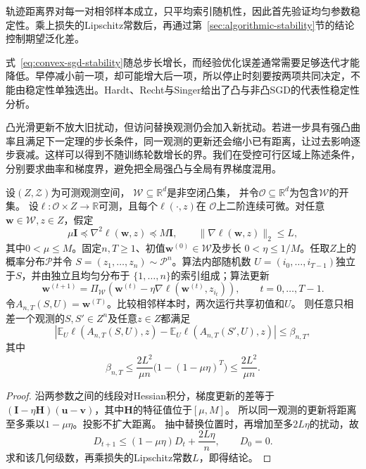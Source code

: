 轨迹距离界对每一对相邻样本成立，只平均索引随机性，因此首先验证均匀参数稳定性。乘上损失的Lipschitz常数后，再通过第~\ref{sec:algorithmic-stability}节的结论控制期望泛化差。

式~\eqref{eq:convex-sgd-stability}随总步长增长，而经验优化误差通常需要足够迭代才能降低。早停减小前一项，却可能增大后一项，所以停止时刻要按两项共同决定，不能由稳定性单独选出。Hardt、Recht与Singer给出了凸与非凸SGD的代表性稳定性分析。


凸光滑更新不放大旧扰动，但访问替换观测仍会加入新扰动。若进一步具有强凸曲率且满足下一定理的步长条件，同一观测的更新还会缩小已有距离，让过去影响逐步衰减。这样可以得到不随训练轮数增长的界。我们在受控可行区域上陈述条件，分别要求曲率和梯度界，避免把全局强凸与全局有界梯度混用。

\begin{theorem}[强凸投影SGD的稳定性]
\label{thm:strongly-convex-sgd-stability}
设$(Z,\mathcal Z)$为可测观测空间，
$\mathcal W\subseteq\mathbb R^d$是非空闭凸集，
并令$\mathcal O\subseteq\mathbb R^d$为包含$\mathcal W$的开集。
设$\ell:\mathcal O\times Z\to\mathbb R$可测，且每个$\ell(\cdot,z)$在
$\mathcal O$上二阶连续可微。对任意$\bm w\in\mathcal W,z\in Z$，假定
\[
 \mu\bm I\preceq\nabla^2\ell(\bm w,z)\preceq M\bm I,
 \qquad \|\nabla\ell(\bm w,z)\|_2\leq L,
\]
其中$0<\mu\leq M$。固定$n,T\geq1$、初值$\bm w^{(0)}\in\mathcal W$及步长
$0<\eta\leq1/M$。任取$Z$上的概率分布$\mathcal P$并令
$S=(z_1,\ldots,z_n)\sim\mathcal P^n$。算法内部随机数
$U=(i_0,\ldots,i_{T-1})$独立于$S$，并由独立且均匀分布于
$\{1,\ldots,n\}$的索引组成；算法更新
\[
 \bm w^{(t+1)}
 =\Pi_{\mathcal W}\!\left(
 \bm w^{(t)}-\eta\nabla\ell(\bm w^{(t)},z_{i_t})\right),
 \qquad t=0,\ldots,T-1.
\]
令$A_{n,T}(S,U)=\bm w^{(T)}$。比较相邻样本时，两次运行共享初值和$U$。
则任意只相差一个观测的$S,S'\in Z^n$及任意$z\in Z$都满足
\[
 \left|\mathbb E_U\ell(A_{n,T}(S,U),z)
 -\mathbb E_U\ell(A_{n,T}(S',U),z)\right|\leq\beta_{n,T},
\]
其中
\[
 \beta_{n,T}\leq\frac{2L^2}{\mu n}
           \bigl(1-(1-\mu\eta)^T\bigr)
 \leq\frac{2L^2}{\mu n}.
\]
\end{theorem}
\begin{proof}
沿两参数之间的线段对Hessian积分，梯度更新的差等于
$(\bm I-\eta\bm H)(\bm u-\bm v)$，其中$\bm H$的特征值位于$[\mu,M]$。
所以同一观测的更新将距离至多乘以$1-\mu\eta$。投影不扩大距离。
抽中替换位置时，再增加至多$2L\eta$的扰动，故
\[
 D_{t+1}\leq(1-\mu\eta)D_t+\frac{2L\eta}{n},\qquad D_0=0.
\]
求和该几何级数，再乘损失的Lipschitz常数$L$，即得结论。
\end{proof}

